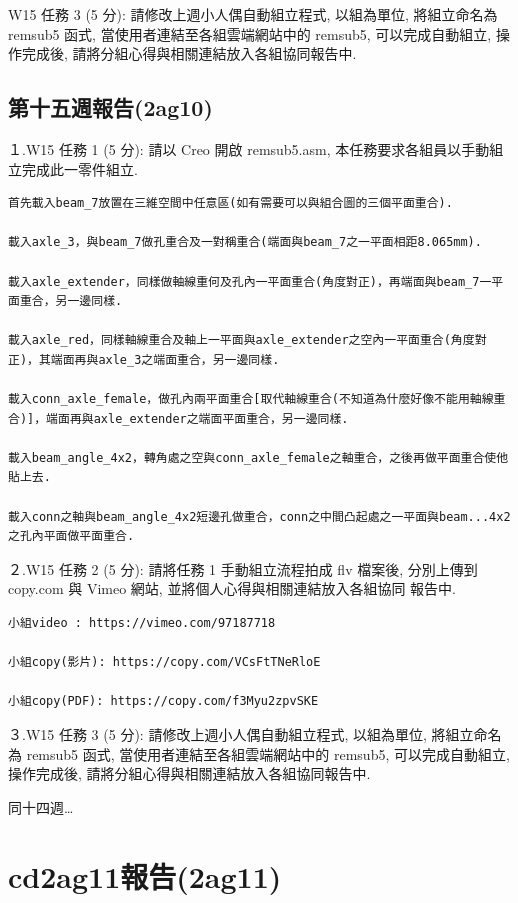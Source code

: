 \documentclass[]{article}
\begin{document}
W15 任務 3 (5 分): 請修改上週小人偶自動組立程式, 以組為單位,
將組立命名為 remsub5 函式, 當使用者連結至各組雲端網站中的 remsub5,
可以完成自動組立, 操作完成後, 請將分組心得與相關連結放入各組協同報告中.

\subsection{第十五週報告(2ag10)}\label{ux7b2cux5341ux4e94ux9031ux5831ux544a2ag10}

１.W15 任務 1 (5 分): 請以 Creo 開啟 remsub5.asm,
本任務要求各組員以手動組立完成此一零件組立.

\begin{verbatim}
首先載入beam_7放置在三維空間中任意區(如有需要可以與組合圖的三個平面重合).

載入axle_3，與beam_7做孔重合及一對稱重合(端面與beam_7之一平面相距8.065mm).

載入axle_extender，同樣做軸線重何及孔內一平面重合(角度對正)，再端面與beam_7一平面重合，另一邊同樣.

載入axle_red，同樣軸線重合及軸上一平面與axle_extender之空內一平面重合(角度對正)，其端面再與axle_3之端面重合，另一邊同樣.

載入conn_axle_female，做孔內兩平面重合[取代軸線重合(不知道為什麼好像不能用軸線重合)]，端面再與axle_extender之端面平面重合，另一邊同樣.

載入beam_angle_4x2，轉角處之空與conn_axle_female之軸重合，之後再做平面重合使他貼上去.

載入conn之軸與beam_angle_4x2短邊孔做重合，conn之中間凸起處之一平面與beam...4x2之孔內平面做平面重合.
\end{verbatim}

２.W15 任務 2 (5 分): 請將任務 1 手動組立流程拍成 flv 檔案後, 分別上傳到
copy.com 與 Vimeo 網站, 並將個人心得與相關連結放入各組協同 報告中.

\begin{verbatim}
小組video : https://vimeo.com/97187718

小組copy(影片): https://copy.com/VCsFtTNeRloE

小組copy(PDF): https://copy.com/f3Myu2zpvSKE
\end{verbatim}

３.W15 任務 3 (5 分): 請修改上週小人偶自動組立程式, 以組為單位,
將組立命名為 remsub5 函式, 當使用者連結至各組雲端網站中的 remsub5,
可以完成自動組立, 操作完成後, 請將分組心得與相關連結放入各組協同報告中.

同十四週\ldots{}

\section{cd2ag11報告(2ag11)}\label{cd2ag11ux5831ux544a2ag11}
\end{document}
